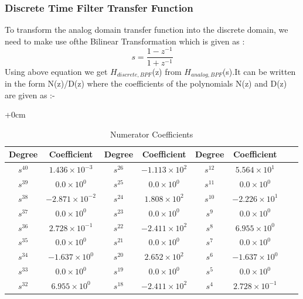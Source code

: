 \documentclass{article}
\begin{document}
\subsubsection{Discrete Time Filter Transfer Function}
To transform the analog domain transfer function into the discrete domain, we need to make use ofthe Bilinear Transformation which is given as :
\begin{equation*}
    s = \frac{1 - z^{-1}}{1 + z^{-1}}
\end{equation*}
Using  above  equation  we  get $H_{discrete,BPF}$(z)  from $H_{analog,BPF}$(s).It  can  be  written  in  the  form N(z)/D(z) where the coefficients of the polynomials N(z) and D(z) are given as :-

\begin{table}[H]
  \centering
		\begin{adjustwidth}{+0cm}{}
		\caption{Numerator Coefficients}
		\begin{tabular}{|c|c|c|c|c|c|c|c|}
\hline
Degree & Coefficient & Degree & Coefficient & Degree & Coefficient\\
\hline
$s^{ 40 }$ & $ 1.436 \times 10^{ -3 }$ & $s^{ 26 }$ & $ -1.113 \times 10^{ 2 }$ & $s^{ 12 }$ & $ 5.564 \times 10^{ 1 }$  \\
\hline
$s^{ 39 }$ & $ 0.0 \times 10^{ 0 }$ & $s^{ 25 }$ & $ 0.0 \times 10^{ 0 }$ & $s^{ 11 }$ & $ 0.0 \times 10^{ 0 }$  \\
\hline
$s^{ 38 }$ & $ -2.871 \times 10^{ -2 }$ & $s^{ 24 }$ & $ 1.808 \times 10^{ 2 }$ & $s^{ 10 }$ & $ -2.226 \times 10^{ 1 }$  \\
\hline
$s^{ 37 }$ & $ 0.0 \times 10^{ 0 }$ & $s^{ 23 }$ & $ 0.0 \times 10^{ 0 }$ & $s^{ 9 }$ & $ 0.0 \times 10^{ 0 }$  \\
\hline
$s^{ 36 }$ & $ 2.728 \times 10^{ -1 }$ & $s^{ 22 }$ & $ -2.411 \times 10^{ 2 }$ & $s^{ 8 }$ & $ 6.955 \times 10^{ 0 }$  \\
\hline
$s^{ 35 }$ & $ 0.0 \times 10^{ 0 }$ & $s^{ 21 }$ & $ 0.0 \times 10^{ 0 }$ & $s^{ 7 }$ & $ 0.0 \times 10^{ 0 }$  \\
\hline
$s^{ 34 }$ & $ -1.637 \times 10^{ 0 }$ & $s^{ 20 }$ & $ 2.652 \times 10^{ 2 }$ & $s^{ 6 }$ & $ -1.637 \times 10^{ 0 }$  \\
\hline
$s^{ 33 }$ & $ 0.0 \times 10^{ 0 }$ & $s^{ 19 }$ & $ 0.0 \times 10^{ 0 }$ & $s^{ 5 }$ & $ 0.0 \times 10^{ 0 }$  \\
\hline
$s^{ 32 }$ & $ 6.955 \times 10^{ 0 }$ & $s^{ 18 }$ & $ -2.411 \times 10^{ 2 }$ & $s^{ 4 }$ & $ 2.728 \times 10^{ -1 }$  \\

\end{tabular}
\end{adjustwidth}
\end{table}
\end{document}
